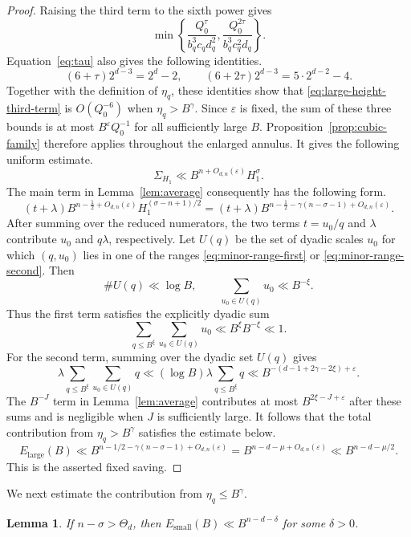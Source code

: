 \documentclass[reqno,a4paper,11pt]{amsart}
\numberwithin{equation}{section}
\newcommand{\eps}{\varepsilon}
\theoremstyle{plain}
\newtheorem{lemma}[theorem]{Lemma}
\theoremstyle{definition}
\begin{document}
\begin{proof}
Raising the third term to the sixth power gives
\begin{equation}\label{eq:large-height-third-term}
 \min\left\{
 \frac{Q_0^\tau}{b_q^3c_qd_q^2},
 \frac{Q_0^{2\tau}}{b_q^3c_q^2d_q}
 \right\}.
\end{equation}
Equation~\eqref{eq:tau} also gives the following identities.
\[
 (6+\tau)2^{d-3}=2^d-2,\qquad
 (6+2\tau)2^{d-3}=5\cdot2^{d-2}-4.
\]
Together with the definition of \(\eta_q\), these identities show that \eqref{eq:large-height-third-term} is \(O(Q_0^{-6})\) when \(\eta_q>B^\gamma\).
Since \(\eps\) is fixed, the sum of these three bounds is at most \(B^\eps Q_0^{-1}\) for all sufficiently large \(B\).
Proposition~\ref{prop:cubic-family} therefore applies throughout the enlarged annulus.
It gives the following uniform estimate.
\[
 \Sigma_{H_1}
 \ll B^{n+O_{d,n}(\eps)}H_1^\sigma.
\]
The main term in Lemma~\ref{lem:average} consequently has the following form.
\[
 (t+\lambda)
 B^{n-\frac12+O_{d,n}(\eps)}
 H_1^{(\sigma-n+1)/2}
 =
 (t+\lambda)
 B^{n-\frac12-\gamma(n-\sigma-1)+O_{d,n}(\eps)}.
\]
After summing over the reduced numerators, the two terms \(t=u_0/q\) and \(\lambda\) contribute \(u_0\) and \(q\lambda\), respectively.
Let \(U(q)\) be the set of dyadic scales \(u_0\) for which \((q,u_0)\) lies in one of the ranges \eqref{eq:minor-range-first} or \eqref{eq:minor-range-second}.
Then
\[
 \#U(q)\ll\log B,
 \qquad
 \sum_{u_0\in U(q)}u_0\ll B^{-\xi}.
\]
Thus the first term satisfies the explicitly dyadic sum
\[
 \sum_{q\leq B^\xi}
 \sum_{u_0\in U(q)}u_0
 \ll B^\xi B^{-\xi}\ll1.
\]
For the second term, summing over the dyadic set \(U(q)\) gives
\[
 \lambda
 \sum_{q\leq B^\xi}
 \sum_{u_0\in U(q)}q
 \ll
 (\log B)\lambda
 \sum_{q\leq B^\xi}q
 \ll
 B^{-(d-1+2\gamma-2\xi)+\eps}.
\]
The \(B^{-J}\) term in Lemma~\ref{lem:average} contributes at most \(B^{2\xi-J+\eps}\) after these sums and is negligible when \(J\) is sufficiently large.
It follows that the total contribution from \(\eta_q>B^\gamma\) satisfies the estimate below.
\begin{equation*}
 E_{\mathrm{large}}(B)
 \ll B^{n-1/2-\gamma(n-\sigma-1)+O_{d,n}(\eps)}
 =B^{n-d-\mu+O_{d,n}(\eps)}
 \ll B^{n-d-\mu/2}.
\end{equation*}
This is the asserted fixed saving.
\end{proof}

We next estimate the contribution from \(\eta_q\leq B^\gamma\).
\begin{lemma}\label{lem:small-height}
If \(n-\sigma>\Theta_d\), then \(E_{\mathrm{small}}(B)\ll B^{n-d-\delta}\) for some \(\delta>0\).
\end{lemma}
\end{document}
